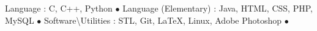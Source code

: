       
\begin{cvhonors}
  \cvhonor
    {\small Language : }
    {\small C, C++, Python}
    {}
    {$\bullet$}
  \cvhonor
    {\small Language (Elementary) : }
    {\small Java, HTML, CSS, PHP, MySQL}
    {}
    {$\bullet$}
  \cvhonor
    {\small Software\textbackslash Utilities : }
    {\small STL, Git, \LaTeX, Linux, Adobe Photoshop}
    {}
    {$\bullet$}
\end{cvhonors}